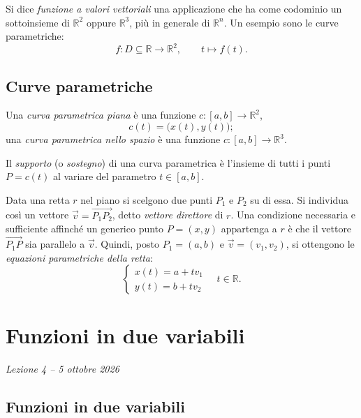 \documentclass[11pt,a4paper]{article}
\begin{document}
\begin{definizione}
Si dice \emph{funzione a valori vettoriali} una applicazione che ha come codominio un sottoinsieme di $\mathbb{R}^2$ oppure $\mathbb{R}^3$, più in generale di $\mathbb{R}^n$. Un esempio sono le curve parametriche:
\[
f : D \subseteq \mathbb{R} \to \mathbb{R}^2, \qquad t \mapsto f(t).
\]
\end{definizione}

\subsection{Curve parametriche}

\begin{definizione}
Una \emph{curva parametrica piana} è una funzione $c : [a, b] \to \mathbb{R}^2$,
\[
c(t) = \big(x(t), y(t)\big);
\]
una \emph{curva parametrica nello spazio} è una funzione $c : [a, b] \to \mathbb{R}^3$.
\end{definizione}

\begin{definizione}
Il \emph{supporto} (o \emph{sostegno}) di una curva parametrica è l'insieme di tutti i punti $P = c(t)$ al variare del parametro $t \in [a, b]$.
\end{definizione}

\begin{esempio}
Data una retta $r$ nel piano si scelgono due punti $P_1$ e $P_2$ su di essa. Si individua così un vettore $\vec v = \overrightarrow{P_1P_2}$, detto \emph{vettore direttore} di $r$. Una condizione necessaria e sufficiente affinché un generico punto $P = (x, y)$ appartenga a $r$ è che il vettore $\overrightarrow{P_1P}$ sia parallelo a $\vec v$. Quindi, posto $P_1 = (a, b)$ e $\vec v = (v_1, v_2)$, si ottengono le \emph{equazioni parametriche della retta}:
\[
\begin{cases} x(t) = a + t v_1 \\ y(t) = b + t v_2 \end{cases} \quad t \in \mathbb{R}.
\]
\end{esempio}

\section[Funzioni in due variabili (Lezione 4 -- 5 ottobre 2026)]{Funzioni in due variabili}
\noindent\emph{Lezione 4 -- 5 ottobre 2026}
\subsection{Funzioni in due variabili}
\end{document}

